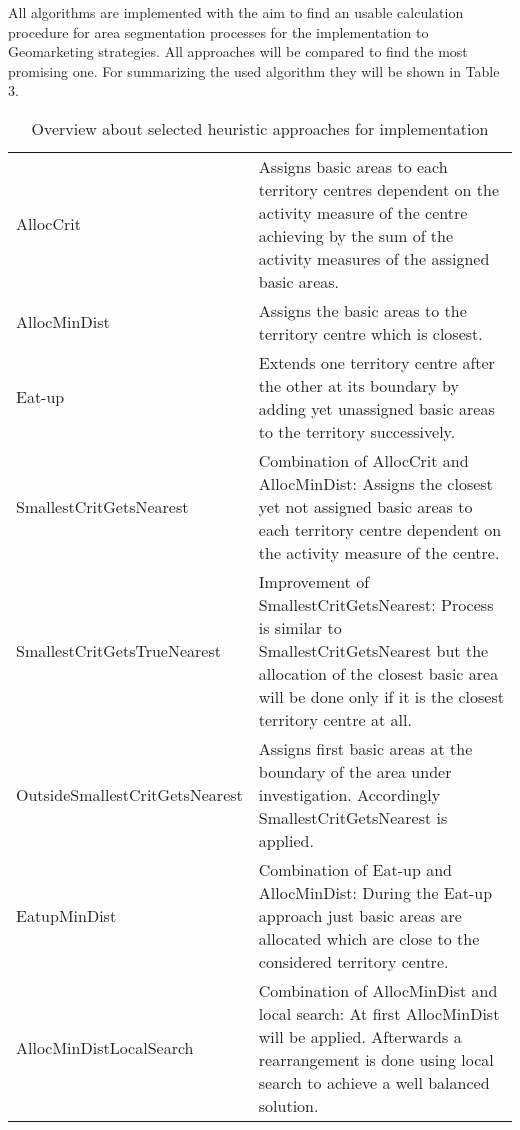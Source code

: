All algorithms are implemented with the aim to find an usable calculation procedure for area segmentation processes for the implementation to Geomarketing strategies. All approaches will be compared to find the most promising one. For summarizing the used algorithm they will be shown in Table 3.


\begin{table}[H]
	\begin{tabular}{|p{5.5cm}|>{\RaggedRight}p{7.5cm}|}
		\hline
		& \centering{Short explanation} \tabularnewline
		\hline
		AllocCrit & Assigns basic areas to each territory centres dependent on the activity measure of the centre achieving by the sum of the activity measures of the assigned basic areas.
		\tabularnewline
		\hline
		AllocMinDist & Assigns the basic areas to the territory centre which is closest.
		\tabularnewline
		\hline
		Eat-up & Extends one territory centre after the other at its boundary by adding yet unassigned basic areas to the territory successively.
		\tabularnewline
		\hline
		SmallestCritGetsNearest & Combination of AllocCrit and AllocMinDist: Assigns the closest yet not assigned basic areas to each territory centre dependent on the activity measure of the centre.
		\tabularnewline
		\hline
		SmallestCritGetsTrueNearest & Improvement of SmallestCritGetsNearest: Process is similar to SmallestCritGetsNearest but the allocation of the closest basic area will be done only if it is the closest territory centre at all.
		\tabularnewline
		\hline
		OutsideSmallestCritGetsNearest & Assigns first basic areas at the boundary of the area under investigation. Accordingly SmallestCritGetsNearest is applied.
		\tabularnewline
		\hline
		EatupMinDist & Combination of Eat-up and AllocMinDist: During the Eat-up approach just basic areas are allocated which are close to the considered territory centre.
		\tabularnewline
		\hline
		AllocMinDistLocalSearch & Combination of AllocMinDist and local search: At first AllocMinDist will be applied. Afterwards a rearrangement is done using local search to achieve a well balanced solution.
		\tabularnewline
		\hline
	\end{tabular}
	\caption{Overview about selected heuristic approaches for implementation}
\end{table}

\newpage

